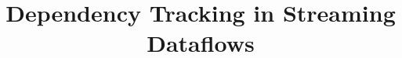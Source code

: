 \documentclass[sigconf]{acmart}
\theoremstyle{remark}
\begin{document}

\title {Dependency Tracking in Streaming Dataflows}





\end{document}

